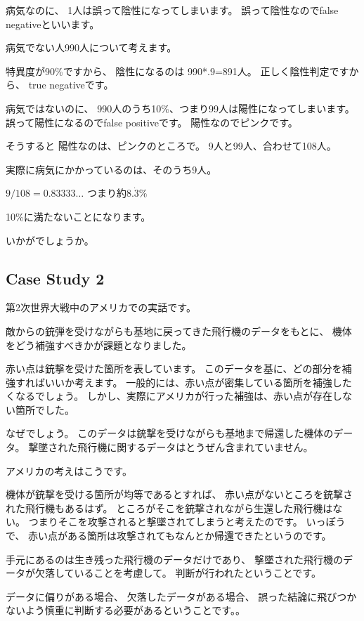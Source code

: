 \documentclass[uplatex,jis2004,dvipdfmx,12pt]{jsarticle}
\begin{document}
病気なのに、
1人は誤って陰性になってしまいます。
誤って陰性なのでfalse negativeといいます。

病気でない人990人について考えます。

特異度が90\%ですから、
陰性になるのは
990*.9=891人。
正しく陰性判定ですから、
true negativeです。

病気ではないのに、
990人のうち10\%、つまり99人は陽性になってしまいます。
誤って陽性になるのでfalse positiveです。
陽性なのでピンクです。

そうすると
陽性なのは、ピンクのところで。
9人と99人、合わせて108人。

実際に病気にかかっているのは、そのうち9人。

$9/108=0.83333\dots$
つまり約$8.\dot{3}\%$

10\%に満たないことになります。

いかがでしょうか。




\subsection{Case Study 2}

第2次世界大戦中のアメリカでの実話です。


敵からの銃弾を受けながらも基地に戻ってきた飛行機のデータをもとに、
機体をどう補強すべきかが課題となりました。

赤い点は銃撃を受けた箇所を表しています。
このデータを基に、どの部分を補強すればいいか考えます。
一般的には、赤い点が密集している箇所を補強したくなるでしょう。
しかし、実際にアメリカが行った補強は、赤い点が存在しない箇所でした。


なぜでしょう。
このデータは銃撃を受けながらも基地まで帰還した機体のデータ。
撃墜された飛行機に関するデータはとうぜん含まれていません。

アメリカの考えはこうです。

機体が銃撃を受ける箇所が均等であるとすれば、
赤い点がないところを銃撃された飛行機もあるはず。
ところがそこを銃撃されながら生還した飛行機はない。
つまりそこを攻撃されると撃墜されてしまうと考えたのです。
いっぽうで、
赤い点がある箇所は攻撃されてもなんとか帰還できたというのです。

手元にあるのは生き残った飛行機のデータだけであり、
撃墜された飛行機のデータが欠落していることを考慮して。
判断が行われたということです。

データに偏りがある場合、
欠落したデータがある場合、
誤った結論に飛びつかないよう慎重に判断する必要があるということです。。
\end{document}
